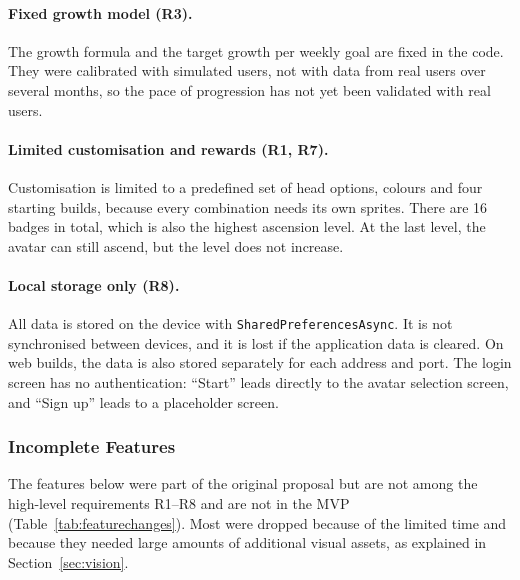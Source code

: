 \documentclass[11pt]{article}
\begin{document}
\paragraph{Fixed growth model (R3).}
The growth formula and the target growth per weekly goal are fixed in the code. They were calibrated with simulated users, not with data from real users over several months, so the pace of progression has not yet been validated with real users.

\paragraph{Limited customisation and rewards (R1, R7).}
Customisation is limited to a predefined set of head options, colours and four starting builds, because every combination needs its own sprites. There are 16 badges in total, which is also the highest ascension level. At the last level, the avatar can still ascend, but the level does not increase.

\paragraph{Local storage only (R8).}
All data is stored on the device with \texttt{SharedPreferencesAsync}. It is not synchronised between devices, and it is lost if the application data is cleared. On web builds, the data is also stored separately for each address and port. The login screen has no authentication: ``Start'' leads directly to the avatar selection screen, and ``Sign up'' leads to a placeholder screen.

\subsubsection{Incomplete Features}

The features below were part of the original proposal but are not among the high-level requirements R1--R8 and are not in the MVP (Table~\ref{tab:featurechanges}). Most were dropped because of the limited time and because they needed large amounts of additional visual assets, as explained in Section~\ref{sec:vision}.
\end{document}
